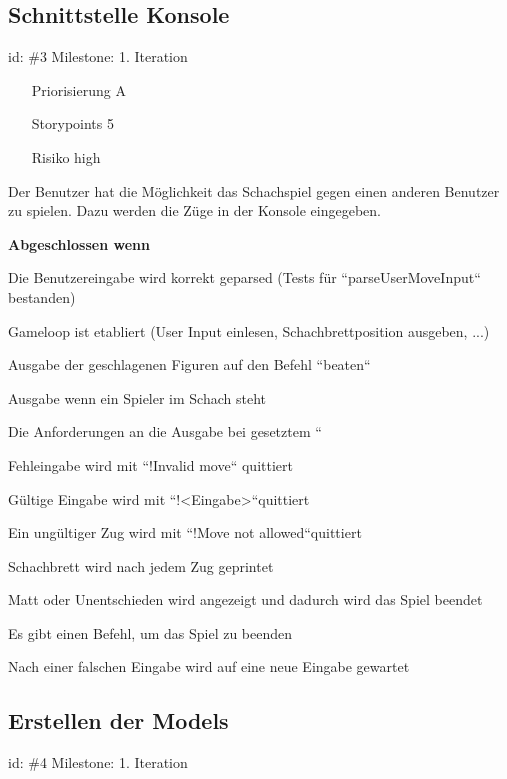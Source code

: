
\subsection*{Schnittstelle Konsole}
id: \#3 Milestone: 1. Iteration\\

\begin{itemize}
\item[Priorisierung] A
\item[Storypoints] 5
\item[Risiko] high
\end{itemize}

Der Benutzer hat die Möglichkeit das Schachspiel gegen einen anderen Benutzer zu spielen. Dazu werden die Züge in der Konsole eingegeben.

\textbf{Abgeschlossen wenn}
\begin{todolist}
    \item[\done]  Die Benutzereingabe wird korrekt geparsed (Tests für ``parseUserMoveInput`` bestanden)
  \item[\done]  Gameloop ist etabliert (User Input einlesen, Schachbrettposition ausgeben, ...)
  \item[\done]  Ausgabe der geschlagenen Figuren auf den Befehl ``beaten``
  \item  Ausgabe wenn ein Spieler im Schach steht
  \item[\done]  Die Anforderungen an die Ausgabe bei gesetztem ``
  \item[\done]  Fehleingabe wird mit ``!Invalid move`` quittiert
  \item[\done]  Gültige Eingabe wird mit ``!<Eingabe>``quittiert
  \item[\done]  Ein ungültiger Zug wird mit ``!Move not allowed``quittiert
  \item[\done]  Schachbrett wird nach jedem Zug geprintet
  \item  Matt oder Unentschieden wird angezeigt und dadurch wird das Spiel beendet
  \item[\done]  Es gibt einen Befehl, um das Spiel zu beenden
  \item[\done]  Nach einer falschen Eingabe wird auf eine neue Eingabe gewartet

\end{todolist}


\subsection*{Erstellen der Models}
id: \#4 Milestone: 1. Iteration\\

